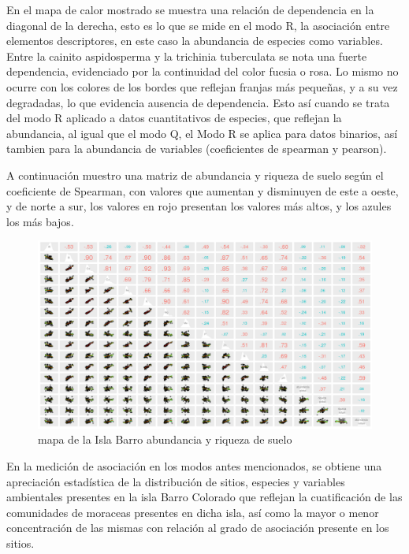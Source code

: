 \documentclass[11pt,]{article}
\begin{document}
En el mapa de calor mostrado se muestra una relación de dependencia en
la diagonal de la derecha, esto es lo que se mide en el modo R, la
asociación entre elementos descriptores, en este caso la abundancia de
especies como variables. Entre la cainito aspidosperma y la trichinia
tuberculata se nota una fuerte dependencia, evidenciado por la
continuidad del color fucsia o rosa. Lo mismo no ocurre con los colores
de los bordes que reflejan franjas más pequeñas, y a su vez degradadas,
lo que evidencia ausencia de dependencia. Esto así cuando se trata del
modo R aplicado a datos cuantitativos de especies, que reflejan la
abundancia, al igual que el modo Q, el Modo R se aplica para datos
binarios, así tambien para la abundancia de variables (coeficientes de
spearman y pearson).

A continuación muestro una matriz de abundancia y riqueza de suelo según
el coeficiente de Spearman, con valores que aumentan y disminuyen de
este a oeste, y de norte a sur, los valores en rojo presentan los
valores más altos, y los azules los más bajos.

\begin{figure}
\centering
\includegraphics[width=1.00000\textwidth]{matriz_correlacion_suelo_abun_riq_spearman.png}
\caption{mapa de la Isla Barro abundancia y riqueza de suelo
\label{fig:bci_map}}
\end{figure}

En la medición de asociación en los modos antes mencionados, se obtiene
una apreciación estadística de la distribución de sitios, especies y
variables ambientales presentes en la isla Barro Colorado que reflejan
la cuatificación de las comunidades de moraceas presentes en dicha isla,
así como la mayor o menor concentración de las mismas con relación al
grado de asociación presente en los sitios.
\end{document}
